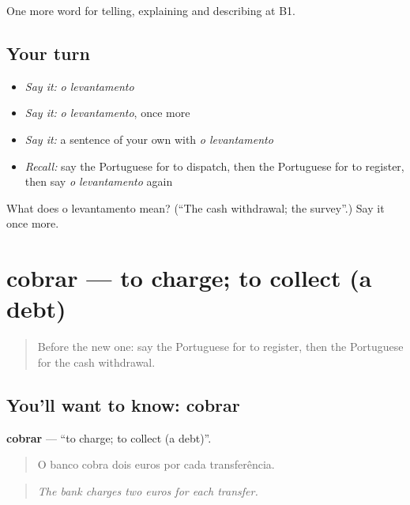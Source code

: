\begin{grammarlens}[title={What you've built}]
One more word for telling, explaining and describing at B1.
\end{grammarlens}

\subsection*{Your turn}
\begin{itemize}
\raggedright
  \item \emph{Say it:} \emph{o levantamento}
  \item \emph{Say it:} \emph{o levantamento}, once more
  \item \emph{Say it:} a sentence of your own with \emph{o levantamento}
  \item \emph{Recall:} say the Portuguese for to dispatch, then the Portuguese for to register, then say \emph{o levantamento} again
\end{itemize}

\begin{tcolorbox}[breakable,colback=teal!4,colframe=teal!35!black,title={Before you move on}]
What does o levantamento mean? (\textquotedblleft{}The cash withdrawal; the survey\textquotedblright{}.) Say it once more.
\end{tcolorbox}
\section[cobrar]{cobrar — to charge; to collect (a debt)}

\label{lesson:PT-C455-cobrar}



\begin{quote}
Before the new one: say the Portuguese for to register, then the Portuguese for the cash withdrawal.
\end{quote}

\subsection*{You'll want to know: cobrar}
\textbf{cobrar} — \textquotedblleft{}to charge; to collect (a debt)\textquotedblright{}.

\begin{quote}
O banco cobra dois euros por cada transferência.
\end{quote}

\begin{quote}
\emph{The bank charges two euros for each transfer.}
\end{quote}

